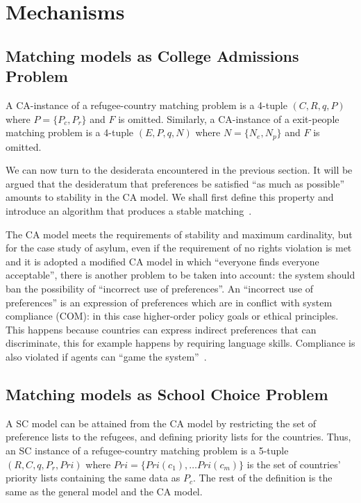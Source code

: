 \section{Mechanisms}\label{mechanisms}%


\subsection{Matching models as College Admissions Problem}\label{matching-model-as-college-admissions-problem}%

A CA-instance of a refugee-country matching problem is a 4-tuple \((C, R, q, P)\) where \(P = \{ P_c, P_r\}\) and \(F\) is omitted.
Similarly, a CA-instance of a exit-people matching problem is a 4-tuple \((E, P, q, N)\) where \(N = \{ N_e ,  N_p\}\) and \(F\) is omitted.

We can now turn to the desiderata encountered in the previous section.
It will be argued that the desideratum that preferences be satisfied “as much as possible” amounts to stability in the CA
model.
We shall first define this property and introduce an algorithm that produces a stable matching~\cite{basshuysen}.

The CA model meets the requirements of stability and maximum cardinality, but for the case study of asylum, even if the requirement of no rights violation is met and it is adopted a modified CA model in which “everyone finds everyone acceptable”, there is another problem to be taken into account: the system should ban the possibility of “incorrect use of preferences”.
An “incorrect use of preferences” is an expression of preferences which are in conflict with system compliance (COM): in this case higher-order policy goals or ethical principles.
This happens because countries can express indirect preferences that can discriminate, this for example happens by requiring language skills.
Compliance is also violated if agents can “game the system”~\cite{basshuysen}.


\subsection{Matching models as School Choice Problem}\label{matching-model-as-school-choice-problem}%

A SC model can be attained from the CA model by restricting the set of preference lists to the refugees, and defining priority lists for the countries.
Thus, an SC instance of a refugee-country matching problem is a 5-tuple \((R, C, q, P_r, Pri)\) where \(Pri = \{Pri(c_1), \ldots Pri(c_m)\}\) is the set of countries’ priority lists containing the same data as \(P_c\).
The rest of the definition is the same as the general model and the CA model.

